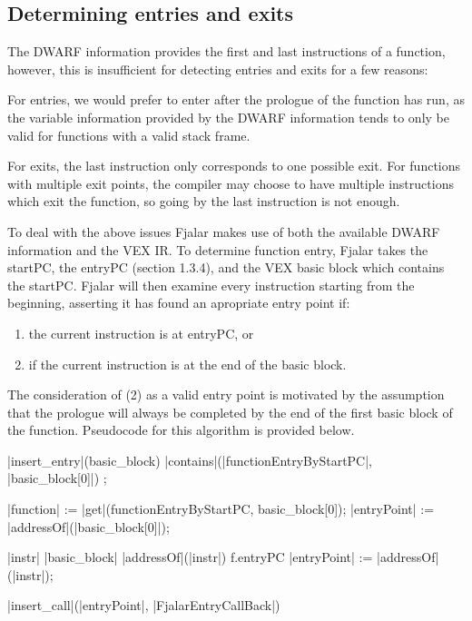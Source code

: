 \documentclass[11pt]{article}
\begin{document}
\subsection{Determining entries and exits}
The DWARF information provides the first and last instructions of a
function, however, this is insufficient for detecting entries and
exits for a few reasons:

For entries, we would prefer to enter after the prologue of the
function has run, as the variable information provided by the DWARF
information tends to only be valid for functions with a valid stack frame.

For exits, the last instruction only corresponds to one possible
exit. For functions with multiple exit points, the compiler
may choose to have multiple instructions which exit the function, so
going by the last instruction is not enough. 

To deal with the above issues Fjalar makes use of both the available DWARF
information and the VEX IR. To determine function entry, Fjalar takes the
startPC, the entryPC (section 1.3.4), and the VEX basic block which
contains the startPC. Fjalar will then examine every instruction
starting from the beginning, asserting it has found an apropriate
entry point if: 

\begin{enumerate}
\item the current instruction is at entryPC, or 
\item if the current instruction is at the end of the basic block. 
\end{enumerate}

The consideration of (2) as a valid entry point is motivated by the
assumption that the prologue will always be completed by the end of
the first basic block of the function. Pseudocode for this algorithm
is provided below.

\begin{program}

\PROC |insert\_entry|(basic\_block) \BODY
  \IF \NOT |contains|(|functionEntryByStartPC|, |basic\_block[0]|) \THEN \EXIT \FI;

   |function| := |get|(functionEntryByStartPC, basic\_block[0]);
   |entryPoint| := |addressOf|(|basic\_block[0]|);

   \FOR |instr| \in |basic\_block| \DO
     \IF |addressOf|(|instr|) \leq f.entryPC \THEN \DO
       |entryPoint| := |addressOf|(|instr|);

   |insert\_call|(|entryPoint|, |FjalarEntryCallBack|)
   \EXIT
   \ENDPROC
 \end{program}
\end{document}

